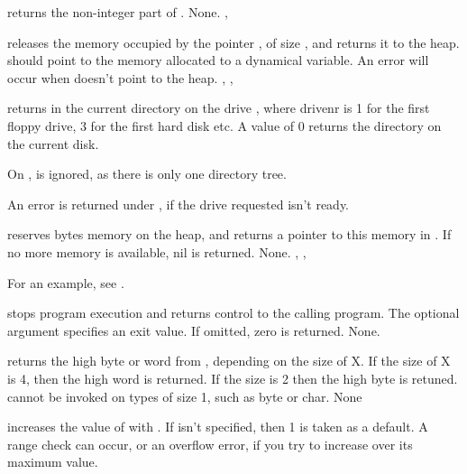 \documentclass{report}
\begin{document}
{ returns the non-integer part of .}
{None.}
{, }



{ releases the memory occupied by the pointer , of size
, and returns it to the heap.  should point to the memory
allocated to a dynamical variable.}
{An error will occur when  doesn't point to the heap.}
{, , }



{ returns in  the current directory on the drive
, where {drivenr} is 1 for the first floppy drive, 3 for the
first hard disk etc. A value of 0 returns the directory on the current disk.

On \linux,  is ignored, as there is only one directory tree.}
{An error is returned under \dos, if the drive requested isn't ready.}
{}



{ reserves  bytes memory on the heap, and returns a
pointer to this memory in . If no more memory is available, nil is
returned.}
{None.}
{, , }

For an example, see .

{ stops program execution and returns control to the calling
program. The optional argument  specifies an exit value. If
omitted, zero is returned.}
{None.}
{}



{ returns the high byte or word from , depending on the size
of X. If the size of X is 4, then the high word is returned. If the size is
2 then the high byte is retuned. 
 cannot be invoked on types of size 1, such as byte or char.}
{None}
{}



{ increases the value of  with .
If  isn't specified, then 1 is taken as a default.}
{A range check can occur, or an overflow error, if you try to increase 
over its maximum value.}
{}
\end{document}
